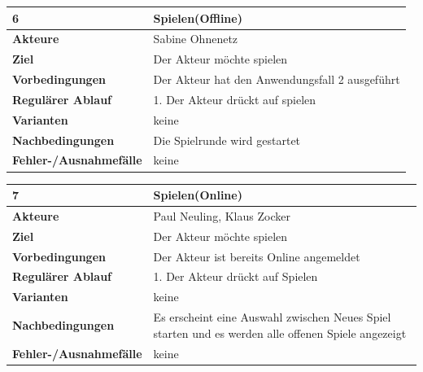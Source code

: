 \documentclass[fontsize=12pt,paper=a4,twoside]{scrartcl}
\begin{document}
\begin{table}
	[H] \label{6} 
	\begin{tabular}
		{|l|p{10cm}|} \hline \textbf{6} & \textbf{Spielen(Offline)} \\
		\hline \textbf{Akteure} & Sabine Ohnenetz\\
		\hline \textbf{Ziel} & Der Akteur möchte spielen\\
		\hline \textbf{Vorbedingungen} & Der Akteur hat den Anwendungsfall 2 ausgeführt \\
		\hline \textbf{Regulärer Ablauf} & 1. Der Akteur drückt auf spielen \\
		\hline \textbf{Varianten} & keine \\
		\hline \textbf{Nachbedingungen} & Die Spielrunde wird gestartet\\
		\hline \textbf{Fehler-/Ausnahmefälle} & keine \\
		\hline 
	\end{tabular}
\end{table}


\begin{table}
	[H] \label{7} 
	\begin{tabular}
		{|l|p{10cm}|} \hline \textbf{7} & \textbf{Spielen(Online)} \\
		\hline \textbf{Akteure} & Paul Neuling, Klaus Zocker\\
		\hline \textbf{Ziel} & Der Akteur möchte spielen\\
		\hline \textbf{Vorbedingungen} & Der Akteur ist bereits Online angemeldet \\
		\hline \textbf{Regulärer Ablauf} & 1. Der Akteur drückt auf Spielen\\
		\hline \textbf{Varianten} & keine \\
		\hline \textbf{Nachbedingungen} & Es erscheint eine Auswahl zwischen Neues Spiel starten und es werden alle offenen Spiele angezeigt\\
		\hline \textbf{Fehler-/Ausnahmefälle} & keine \\
		\hline 
	\end{tabular}
\end{table}
\end{document}

